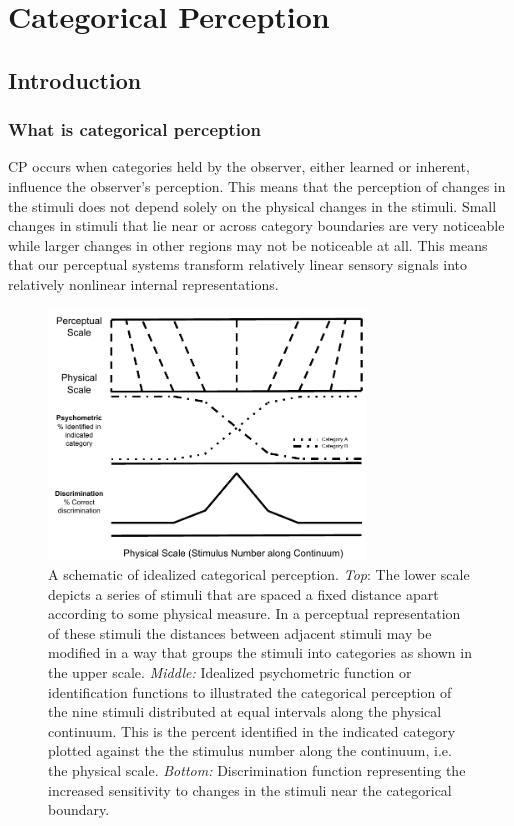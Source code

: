 \chapter{Categorical Perception}

\section{Introduction}
\subsection{What is categorical perception}

\acf{CP} occurs when categories held by the observer, either learned or inherent, influence the observer’s perception. This means that the perception of changes in the stimuli does not depend solely on the physical changes in the stimuli. Small changes in stimuli that lie near or across category boundaries are very noticeable while larger changes in other regions may not be noticeable at all. This means that our perceptual systems transform relatively linear sensory signals into relatively nonlinear internal representations.

\begin{figure}[h] 
  \centering
  \includegraphics[width=0.75\textwidth]{figures/CP_def.pdf}
  \caption[A schematic of idealized categorical perception]
{A schematic of idealized categorical perception. \emph{Top}: The lower scale depicts a series of stimuli that are spaced a fixed distance apart according to some physical measure. In a perceptual representation of these stimuli the distances between adjacent stimuli may be modified in a way that groups the stimuli into categories as shown in the upper scale. \emph{Middle:} Idealized psychometric function or identification functions to illustrated the categorical perception of the nine stimuli distributed at equal intervals along the physical continuum. This is the percent identified in the indicated category plotted against the the stimulus number along the continuum, i.e. the physical scale. \emph{Bottom:} Discrimination function representing the increased sensitivity to changes in the stimuli near the categorical boundary.}
  \label{fig:cpdef}
\end{figure}

